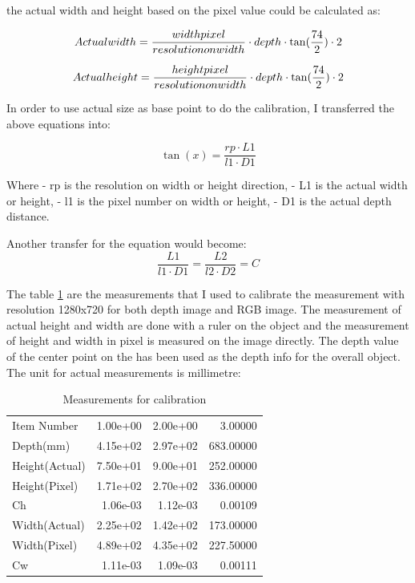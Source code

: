 \documentclass[
  oneside]{ubcthesis}
\begin{document}
the actual width and height based on the pixel value could be calculated as:

\[ Actual width = \frac{width \space pixel}{resolution \space on \space width} \cdot depth \cdot \tan(\frac{74}{2}) \cdot 2 \]

\[ Actual height = \frac{height \space pixel}{resolution \space on \space width} \cdot depth \cdot \tan(\frac{74}{2}) \cdot 2 \]

In order to use actual size as base point to do the calibration, I transferred the above equations into:

\[ \tan(x) = \frac{rp \cdot L1}{l1 \cdot D1} \]

Where
- rp is the resolution on width or height direction,
- L1 is the actual width or height,
- l1 is the pixel number on width or height,
- D1 is the actual depth distance.

Another transfer for the equation would become:
\[\frac{L1}{l1 \cdot D1} = \frac{L2}{l2 \cdot D2} = C\]

The table \ref{tab:mytable1} are the measurements that I used to calibrate the measurement with resolution 1280x720 for both depth image and RGB image. The measurement of actual height and width are done with a ruler on the object and the measurement of height and width in pixel is measured on the image directly. The depth value of the center point on the has been used as the depth info for the overall object. The unit for actual measurements is millimetre:

\begin{table}

\caption{\label{tab:mytable1}Measurements for calibration}
\centering
\begin{tabular}[t]{lrrr}
\toprule
Item Number & 1.00e+00 & 2.00e+00 & 3.00000\\
Depth(mm) & 4.15e+02 & 2.97e+02 & 683.00000\\
Height(Actual) & 7.50e+01 & 9.00e+01 & 252.00000\\
Height(Pixel) & 1.71e+02 & 2.70e+02 & 336.00000\\
Ch & 1.06e-03 & 1.12e-03 & 0.00109\\
\addlinespace
Width(Actual) & 2.25e+02 & 1.42e+02 & 173.00000\\
Width(Pixel) & 4.89e+02 & 4.35e+02 & 227.50000\\
Cw & 1.11e-03 & 1.09e-03 & 0.00111\\
\bottomrule
\end{tabular}
\end{table}
\end{document}
